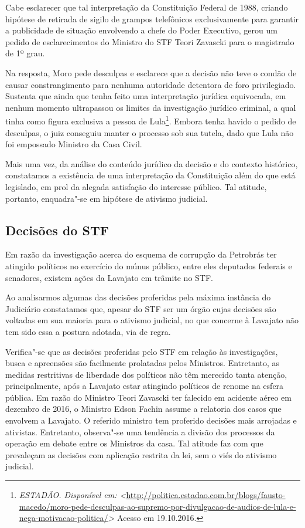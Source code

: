 {Cabe esclarecer que tal interpretação da Constituição Federal de 1988,
criando hipótese de retirada de sigilo de grampos telefônicos
exclusivamente para garantir a publicidade de situação envolvendo a
chefe do Poder Executivo, gerou um pedido de esclarecimentos do Ministro
do STF Teori Zavascki para o magistrado de 1º grau.

Na resposta, Moro pede desculpas e esclarece que a decisão não teve o
condão de causar constrangimento para nenhuma autoridade detentora de
foro privilegiado. Sustenta que ainda que tenha feito uma interpretação
jurídica equivocada, em nenhum momento ultrapassou os limites da
investigação jurídico criminal, a qual tinha como figura exclusiva a
pessoa de Lula\footnote{\emph{ESTADÃO. Disponível em:
  \textless{}}\href{http://politica.estadao.com.br/blogs/fausto-macedo/moro-pede-desculpas-ao-supremo-por-divulgacao-de-audios-de-lula-e-nega-motivacao-politica/}{{http://politica.estadao.com.br/blogs/fausto-macedo/moro-pede-desculpas-ao-supremo-por-divulgacao-de-audios-de-lula-e-nega-motivacao-politica/}}\emph{\textgreater{}}
  Acesso em 19.10.2016.}. Embora tenha havido o pedido de desculpas, o
juiz conseguiu manter o processo sob sua tutela, dado que Lula não foi
empossado Ministro da Casa Civil.

Mais uma vez, da análise do conteúdo jurídico da decisão e do contexto
histórico, constatamos a existência de uma interpretação da Constituição
além do que está legislado, em prol da alegada satisfação do interesse
público. Tal atitude, portanto, enquadra"-se em hipótese de ativismo
judicial.

\subsection{Decisões do STF}

Em razão da investigação acerca do esquema de corrupção da Petrobrás ter
atingido políticos no exercício do múnus público, entre eles deputados
federais e senadores, existem ações da Lavajato em trâmite no STF.

Ao analisarmos algumas das decisões proferidas pela máxima instância do
Judiciário constatamos que, apesar do STF ser um órgão cujas decisões
são voltadas em sua maioria para o ativismo judicial, no que concerne à
Lavajato não tem sido essa a postura adotada, via de regra.

Verifica"-se que as decisões proferidas pelo STF em relação às
investigações, busca e apreensões são facilmente prolatadas pelos
Ministros. Entretanto, as medidas restritivas de liberdade dos políticos
não têm merecido tanta atenção, principalmente, após a Lavajato estar
atingindo políticos de renome na esfera pública. Em razão do Ministro
Teori Zavascki ter falecido em acidente aéreo em dezembro de 2016, o
Ministro Edson Fachin assume a relatoria dos casos que envolvem a
Lavajato. O referido ministro tem proferido decisões mais arrojadas e
ativistas. Entretanto, observa"-se uma tendência a divisão dos processos
da operação em debate entre os Ministros da casa. Tal atitude faz com
que prevaleçam as decisões com aplicação restrita da lei, sem o viés do
ativismo judicial.

}
